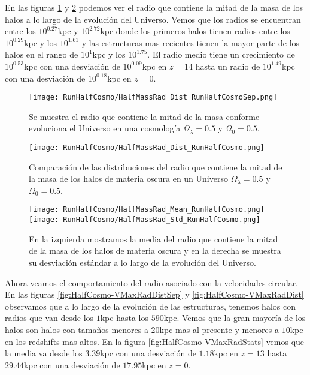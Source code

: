 En las figuras \ref{fig:HalfCosmo-HalfMassRadDistSep} y \ref{fig:HalfCosmo-HalfMassRadDist} podemos ver el radio que contiene la mitad de la masa de los halos a lo largo de la evolución del Universo. Vemos que los radios se encuentran entre los $10^{0.27}$kpc y $10^{2.72}$kpc donde los primeros halos tienen radios entre los $10^{0.29}$kpc y los $10^{1.61}$ y las estructuras mas recientes tienen la mayor parte de los halos en el rango de $10^{1}$kpc y los $10^{1.75}$. El radio medio tiene un crecimiento de $10^{0.53}$kpc con una desviación de $10^{0.09}$kpc en $z=14$ hasta un radio de $10^{1.49}$kpc con una desviación de $10^{0.18}$kpc en $z=0$.

\begin{figure}[H]
    \centering
    \texttt{[image: RunHalfCosmo/HalfMassRad\_Dist\_RunHalfCosmoSep.png]}
    \caption[Radio que contiene la mitad de la masa]{\footnotesize Se muestra el radio que contiene la mitad de la masa conforme evoluciona el Universo en una cosmología $\Omega_\lambda = 0.5 $ y $\Omega_0 = 0.5$.}
    \label{fig:HalfCosmo-HalfMassRadDistSep}
\end{figure}

\begin{figure}[H]
    \centering
    \texttt{[image: RunHalfCosmo/HalfMassRad\_Dist\_RunHalfCosmo.png]}
    \caption[Distribución del Radio que contiene la mitad de la masa]{\footnotesize Comparación de las distribuciones del radio que contiene la mitad de la masa de los halos de materia oscura en un Universo $\Omega_\lambda = 0.5 $ y $\Omega_0 = 0.5$.}
    \label{fig:HalfCosmo-HalfMassRadDist}
\end{figure}

\begin{figure}[H]
    \centering
    \texttt{[image: RunHalfCosmo/HalfMassRad\_Mean\_RunHalfCosmo.png]}
    \texttt{[image: RunHalfCosmo/HalfMassRad\_Std\_RunHalfCosmo.png]}
    \caption[Media y desviación estándar del radio de la mitad de la masa]{\footnotesize En la izquierda mostramos la media del radio que contiene la mitad de la masa de los halos de materia oscura y en la derecha se muestra su desviación estándar a lo largo de la evolución del Universo.}
    \label{fig:HalfCosmo-HalfMassRadStats}
\end{figure}

Ahora veamos el comportamiento del radio asociado con la velocidades circular. En las figuras \ref{fig:HalfCosmo-VMaxRadDistSep} y \ref{fig:HalfCosmo-VMaxRadDist} observamos que a lo largo de la evolución de las estructuras, tenemos halos con radios que van desde los $1$kpc hasta los $590$kpc. Vemos que la gran mayoría de los halos son halos con tamaños menores a $20$kpc mas al presente y menores a $10$kpc en los redshifts mas altos. En la figura \ref{fig:HalfCosmo-VMaxRadStats} vemos que la media va desde los $3.39$kpc con una desviación de $1.18$kpc en $z=13$ hasta $29.44$kpc con una desviación de $17.95$kpc en $z=0$.


